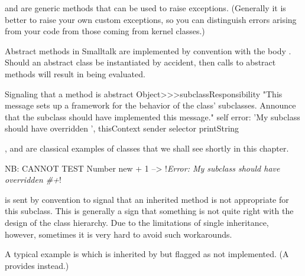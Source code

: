 \documentclass[a4paper,10pt,twoside]{book}
\begin{document}

 and  are generic methods that can be used to raise exceptions.
(Generally it is better to raise your own custom exceptions, so you can distinguish errors arising from your code from those coming from kernel classes.)

Abstract methods in Smalltalk are implemented by convention with the body . Should an abstract class be instantiated by accident, then calls to abstract methods will result in  being evaluated.

\begin{method}{Signaling that a method is abstract}
Object>>>subclassResponsibility
    "This message sets up a framework for the behavior of the class' subclasses.
    Announce that the subclass should have implemented this message."
    self error: 'My subclass should have overridden ', thisContext sender selector printString
\end{method}

,  and  are classical examples of  classes that we shall see shortly in this chapter.

\begin{code}{NB: CANNOT TEST}
Number new + 1 --> !\emph{Error: My subclass should have overridden \#+}!
\end{code}

 is sent by convention to signal that an inherited method is not appropriate for this subclass. This is generally a sign that something is not quite right with the design of the class hierarchy. Due to the limitations of single inheritance, however, sometimes it is very hard to avoid such workarounds. 

A typical example is  which is inherited by  but flagged as not implemented. (A  provides  instead.)


\end{document}
